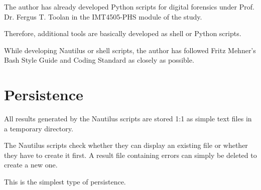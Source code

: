 The author has already developed Python scripts for digital forensics under Prof. Dr. Fergus T. Toolan in the IMT4505-PHS module of the study.

Therefore, additional tools are basically developed as shell or Python scripts.

While developing Nautilus or shell scripts, the author has followed Fritz Mehner's Bash Style Guide and Coding Standard as closely as possible. \cite{Mehner2014}

\section{Persistence}

All results generated by the Nautilus scripts are stored 1:1 as simple text files in a temporary directory.

The Nautilus scripts check whether they can display an existing file or whether they have to create it first. A result file containing errors can simply be deleted to create a new one.

This is the simplest type of persistence.
